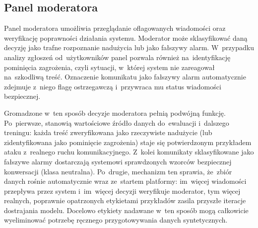 \subsection{Panel moderatora}

Panel moderatora umożliwia przeglądanie oflagowanych wiadomości oraz weryfikację poprawności działania systemu. Moderator może sklasyfikować daną decyzję jako trafne rozpoznanie nadużycia lub jako fałszywy alarm. W~przypadku analizy zgłoszeń od~użytkowników panel pozwala również na~identyfikację pominięcia zagrożenia, czyli sytuacji, w~której system nie zareagował na~szkodliwą treść. Oznaczenie komunikatu jako fałszywy alarm automatycznie zdejmuje z~niego flagę ostrzegawczą i~przywraca mu status wiadomości bezpiecznej.

Gromadzone w~ten sposób decyzje moderatora pełnią podwójną funkcję. Po~pierwsze, stanowią wartościowe źródło danych do~ewaluacji i~dalszego treningu: każda treść zweryfikowana jako rzeczywiste nadużycie (lub zidentyfikowana jako pominięcie zagrożenia) staje się potwierdzonym przykładem ataku z~realnego ruchu komunikacyjnego. Z~kolei komunikaty sklasyfikowane jako fałszywe alarmy dostarczają systemowi sprawdzonych wzorców bezpiecznej konwersacji (klasa neutralna). Po~drugie, mechanizm ten sprawia, że~zbiór danych rośnie automatycznie wraz ze~startem platformy: im~więcej wiadomości przepływa przez system i~im~więcej decyzji weryfikuje moderator, tym więcej realnych, poprawnie opatrzonych etykietami przykładów zasila przyszłe iteracje dostrajania modelu. Docelowo etykiety nadawane w~ten sposób mogą całkowicie wyeliminować potrzebę ręcznego przygotowywania danych syntetycznych.
